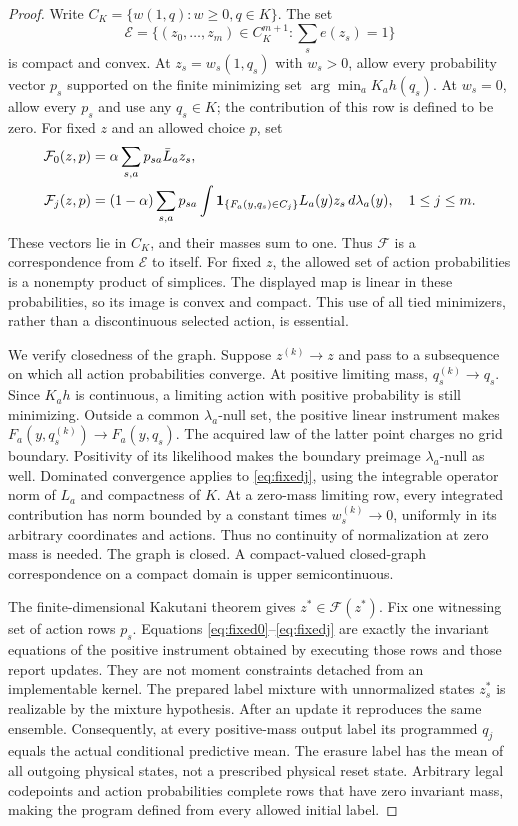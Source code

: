 \begin{proof}
Write $C_K=\{w(1,q):w\ge0,q\in K\}$. The set
\[
 \mathcal E=\{(z_0,\ldots,z_m)\in C_K^{m+1}:\sum_se(z_s)=1\}
\]
is compact and convex. At $z_s=w_s(1,q_s)$ with $w_s>0$, allow every probability vector $p_s$ supported on the finite minimizing set $\arg\min_aK_ah(q_s)$. At $w_s=0$, allow every $p_s$ and use any $q_s\in K$; the contribution of this row is defined to be zero. For fixed $z$ and an allowed choice $p$, set
\begin{align}
 \mathcal F_0(z,p)&=\alpha\sum_{s,a}p_{sa}\bar L_az_s,\label{eq:fixed0}\\
 \mathcal F_j(z,p)&=(1-\alpha)\sum_{s,a}p_{sa}
 \int\mathbf 1_{\{F_a(y,q_s)\in C_j\}}L_a(y)z_s\,d\lambda_a(y),
 \quad 1\le j\le m.\label{eq:fixedj}
\end{align}
These vectors lie in $C_K$, and their masses sum to one. Thus $\mathcal F$ is a correspondence from $\mathcal E$ to itself. For fixed $z$, the allowed set of action probabilities is a nonempty product of simplices. The displayed map is linear in these probabilities, so its image is convex and compact. This use of all tied minimizers, rather than a discontinuous selected action, is essential.

We verify closedness of the graph. Suppose $z^{(k)}\to z$ and pass to a subsequence on which all action probabilities converge. At positive limiting mass, $q_s^{(k)}\to q_s$. Since $K_ah$ is continuous, a limiting action with positive probability is still minimizing. Outside a common $\lambda_a$-null set, the positive linear instrument makes $F_a(y,q_s^{(k)})\to F_a(y,q_s)$. The acquired law of the latter point charges no grid boundary. Positivity of its likelihood makes the boundary preimage $\lambda_a$-null as well. Dominated convergence applies to \eqref{eq:fixedj}, using the integrable operator norm of $L_a$ and compactness of $K$. At a zero-mass limiting row, every integrated contribution has norm bounded by a constant times $w_s^{(k)}\to0$, uniformly in its arbitrary coordinates and actions. Thus no continuity of normalization at zero mass is needed. The graph is closed. A compact-valued closed-graph correspondence on a compact domain is upper semicontinuous.

The finite-dimensional Kakutani theorem \cite{Kakutani1941} gives $z^*\in\mathcal F(z^*)$. Fix one witnessing set of action rows $p_s$. Equations \eqref{eq:fixed0}--\eqref{eq:fixedj} are exactly the invariant equations of the positive instrument obtained by executing those rows and those report updates. They are not moment constraints detached from an implementable kernel. The prepared label mixture with unnormalized states $z_s^*$ is realizable by the mixture hypothesis. After an update it reproduces the same ensemble. Consequently, at every positive-mass output label its programmed $q_j$ equals the actual conditional predictive mean. The erasure label has the mean of all outgoing physical states, not a prescribed physical reset state. Arbitrary legal codepoints and action probabilities complete rows that have zero invariant mass, making the program defined from every allowed initial label.
\end{proof}

